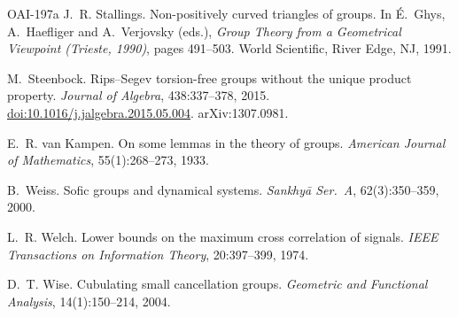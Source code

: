 \documentclass[11pt]{article}
\theoremstyle{definition}
\theoremstyle{plain}
\newcommand{\doi}[1]{\href{https://doi.org/#1}{doi:#1}}
\begin{document}
\begin{thebibliography}{OAI-197a}
J.~R. Stallings.
\newblock Non-positively curved triangles of groups.
\newblock In \'E.~Ghys, A.~Haefliger and A.~Verjovsky (eds.), \emph{Group Theory from a Geometrical Viewpoint (Trieste, 1990)}, pages 491--503. World Scientific, River Edge, NJ, 1991.

M.~Steenbock.
\newblock Rips--Segev torsion-free groups without the unique product property.
\newblock \emph{Journal of Algebra}, 438:337--378, 2015. \doi{10.1016/j.jalgebra.2015.05.004}. arXiv:1307.0981.

E.~R. van Kampen.
\newblock On some lemmas in the theory of groups.
\newblock \emph{American Journal of Mathematics}, 55(1):268--273, 1933.

B.~Weiss.
\newblock Sofic groups and dynamical systems.
\newblock \emph{Sankhy\=a Ser.~A}, 62(3):350--359, 2000.

L.~R. Welch.
\newblock Lower bounds on the maximum cross correlation of signals.
\newblock \emph{IEEE Transactions on Information Theory}, 20:397--399, 1974.

D.~T. Wise.
\newblock Cubulating small cancellation groups.
\newblock \emph{Geometric and Functional Analysis}, 14(1):150--214, 2004.

\end{thebibliography}
\end{document}
